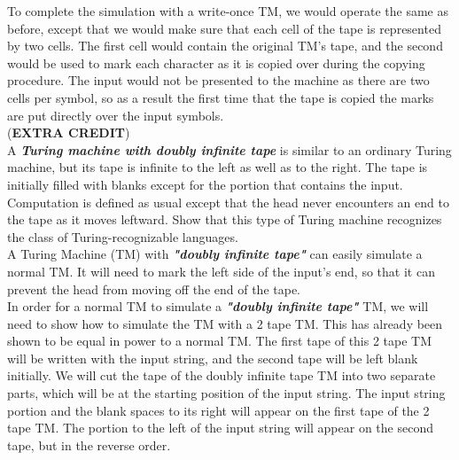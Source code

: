 \documentclass[12pt]{article}
\begin{document}
To complete the simulation with a write-once TM, we would operate the same as before,
except that we would make sure that each cell of the tape is represented by two cells.
The first cell would contain the original TM's tape, and the second would be used to
mark each character as it is copied over during the copying procedure. The input would
not be presented to the machine as there are two cells per symbol, so as a result the
first time that the tape is copied the marks are put directly over the input symbols. \\

 (\textbf{EXTRA CREDIT}) \\

A \textbf{\textit{Turing machine with doubly infinite tape}} is similar to an ordinary 
Turing machine, but its tape is infinite to the left as well as to the right. 
The tape is initially filled with blanks except for the portion that contains the input. 
Computation is defined as usual except that the head never encounters an end to the tape 
as it moves leftward. Show that this type of Turing machine recognizes the class of
Turing-recognizable languages. \\

A Turing Machine (TM) with \textbf{\textit{"doubly infinite tape"}} can easily
simulate a normal TM. It will need to mark the left side of the input's end, so
that it can prevent the head from moving off the end of the tape. \\

In order for a normal TM to simulate a \textbf{\textit{"doubly infinite tape"}} TM,
we will need to show how to simulate the TM with a 2 tape TM. This has already been
shown to be equal in power to a normal TM. The first tape of this 2 tape TM will be
written with the input string, and the second tape will be left blank initially.
We will cut the tape of the doubly infinite tape TM into two separate parts, which
will be at the starting position of the input string. The input string portion and
the blank spaces to its right will appear on the first tape of the 2 tape TM. The
portion to the left of the input string will appear on the second tape, but in
the reverse order. \\

\pagebreak
\end{document}
